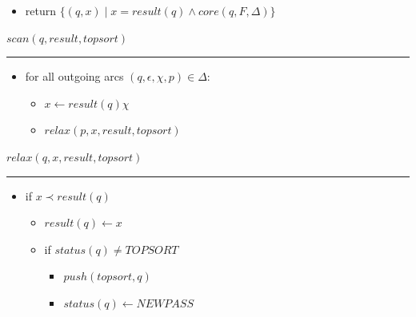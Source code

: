 \documentclass{article}
\newcommand{\Xset}{\!\leftarrow\!}
\newcommand{\Xin}{\!\in\!}
\newcommand{\Xeq}{\!=\!}
\theoremstyle{definition}
\begin{document}
\begin{multicols}{2}
\begin{itemize}[leftmargin=0in]
        \item[] return $\{ (q, x) \mid x \Xeq result(q) \wedge core(q, F, \Delta) \}$
    \end{itemize}

    \bigskip

    $scan(q, result, topsort)$
    \hrule
    \begin{itemize}[leftmargin=0in]
        \smallskip
        \item[] for all outgoing arcs $(q, \epsilon, \chi, p) \Xin \Delta$:
        \begin{itemize}
            \item[] $x \Xset result(q) \chi$
            \item[] $relax(p, x, result, topsort)$
        \end{itemize}
    \end{itemize}

    \bigskip

    $relax(q, x, result, topsort)$
    \hrule
    \begin{itemize}[leftmargin=0in]
        \smallskip
        \item[] if $x \prec result(q)$
        \begin{itemize}
            \item[] $result(q) \Xset x$
            \item[] if $status(q) \neq \mathit{TOPSORT}$
            \begin{itemize}
                \item[] $push(topsort, q)$
                \item[] $status(q) \Xset \mathit{NEWPASS}$
            \end{itemize}
        \end{itemize}
    \end{itemize}

    \bigskip



\end{multicols}
\end{document}
